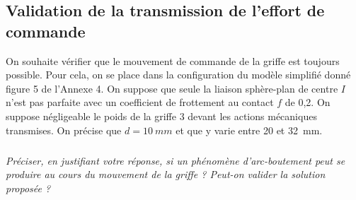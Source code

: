 \documentclass[10pt,fleqn]{article} %
\begin{document}
\begin{multicols}{2}
\subsection*{Validation de la transmission de l'effort de commande}


On souhaite vérifier que le mouvement de commande de la griffe est toujours possible. Pour cela, on se
place dans la configuration du modèle simplifié donné figure 5 de l'Annexe 4. On suppose que seule la liaison
sphère-plan de centre $I$ n'est pas parfaite avec un coefficient de frottement au contact $f$ de 0,2. On suppose
négligeable le poids de la griffe 3 devant les actions mécaniques transmises. On précise que $d=\SI{10}{mm}$ et que
y varie entre 20 et \SI{32}{mm}.

\subparagraph{}\textit{Préciser, en justifiant votre réponse, si un phénomène d'arc-boutement peut se produire au cours du mouvement
de la griffe ? Peut-on valider la solution proposée ?}
\ifprof
\begin{corrige}~\\
\end{corrige}
\else
\fi







\end{multicols}

%
\end{document}
